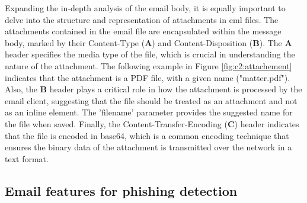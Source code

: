 

Expanding the in-depth analysis of the email body, it is equally important to delve into the structure and representation of attachments in \ac{eml} files. The attachments contained in the email file are encapsulated within the message body, marked by their Content-Type (\textbf{A}) and Content-Disposition (\textbf{B}). The \textbf{A} header specifies the media type of the file, which is crucial in understanding the nature of the attachment. The following example in Figure \ref{fig:c2:attachement} indicates that the attachment is a PDF file, with a given name ("matter.pdf"). Also, the \textbf{B} header plays a critical role in how the attachment is processed by the email client, suggesting that the file should be treated as an attachment and not as an inline element. The 'filename' parameter provides the suggested name for the file when saved. Finally, the Content-Transfer-Encoding (\textbf{C}) header indicates that the file is encoded in base64, which is a common encoding technique that ensures the binary data of the attachment is transmitted over the network in a text format.



\begin{comment}
The EML (Email) is a common format for all types of email software. We can think of the
EML file as a file generated after the email is archived, retaining the original HTML format and title, and so forth. The basis of our detection system is the EML file, which provides us with large email-related information. Fortunately, most mail systems provide a window to download EML files directly. Besides, when the user logs in to the mailbox client, the EML file is automatically downloaded to the local.
Each EML file has a standard format, which allows it to load by specified rules. In the EML file, some of the information is base64 encrypted, so it needs to be decrypted to get the rawest data. In the process of extracting, the email file that missing field values will be considered abnormal data and be discarded.
\end{comment}

\subsection{Email features for phishing detection}


